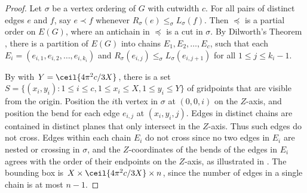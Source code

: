 \documentclass[10pt,twocolumn]{article}
\begin{document}
\begin{proof} Let $\sigma$ be a vertex ordering of $G$ with cutwidth $c$. For
all pairs of distinct edges $e$ and $f$, say $e\prec f$ whenever
$R_\sigma(e)\leq_\sigma L_\sigma(f)$. Then $\preceq$ is a partial order on
$E(G)$, where an antichain in $\preceq$ is a cut in $\sigma$. By Dilworth's
Theorem \citep{Dilworth50}, there is a partition of $E(G)$ into chains
$E_1,E_2,\dots,E_c$, such that each $E_i=(e_{i,1},e_{i,2},\dots,e_{i,k_i})$ and
$R_\sigma(e_{i,j})\leq_\sigma L_\sigma(e_{i,j+1})$ for all $1\leq j\leq k_i-1$.

By  with $Y=\ceil{4\pi^2c/3X}$,  there is a set
$S=\{(x_i,y_i):1\leq i\leq c, 1\leq x_i\leq X,1\leq y_i\leq Y\}$ of gridpoints
that are visible from the origin. Position the $i$th vertex in $\sigma$ at
$(0,0,i)$ on the $Z$-axis, and position the bend for each edge $e_{i,j}$ at
$(x_i,y_i,j)$. Edges in distinct chains are contained in distinct planes that
only intersect in the $Z$-axis. Thus such edges do not cross. Edges within each
chain $E_i$ do not cross since no two edges in $E_i$ are nested or crossing in
$\sigma$, and the $Z$-coordinates of the bends of the edges in $E_i$ agrees with 
the order of their endpoints on the $Z$-axis, as illustrated in
. The bounding box is
$X\times\ceil{4\pi^2c/3X}\times n$, since the number of edges in a single chain
is at most $n-1$. \end{proof}

\end{document}

